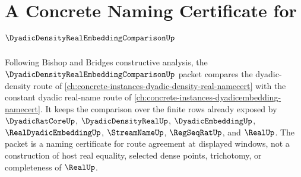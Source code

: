 \chapter{A Concrete Naming Certificate for $\DyadicDensityRealEmbeddingComparisonUp$}
\label{ch:concrete-instances-dyadic-density-real-embedding-comparison-namecert}

Following Bishop and Bridges constructive analysis, the
$\DyadicDensityRealEmbeddingComparisonUp$ packet compares the dyadic-density
route of \autoref{ch:concrete-instances-dyadic-density-real-namecert} with the
constant dyadic real-name route of
\autoref{ch:concrete-instances-dyadicembedding-namecert}. It keeps the
comparison over the finite rows already exposed by
$\DyadicRatCoreUp$, $\DyadicDensityRealUp$, $\DyadicEmbeddingUp$,
$\RealDyadicEmbeddingUp$, $\StreamNameUp$, $\RegSeqRatUp$, and $\RealUp$.
The packet is a naming certificate for route agreement at displayed windows,
not a construction of host real equality, selected dense points, trichotomy,
or completeness of $\RealUp$.


